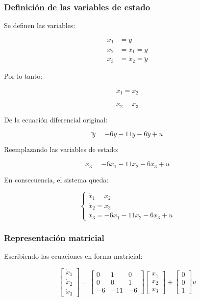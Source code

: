 \documentclass[12pt,a4paper]{article}
\begin{document}
\subsubsection*{Definición de las variables de estado}
Se definen las variables:

\begin{align}x_1&=y\\x_2&=\dot{x}_1=\dot{y}\\x_3&=\dot{x}_2=\ddot{y}\end{align}

Por lo tanto:

\begin{equation}\dot{x}_1=x_2\end{equation}

\begin{equation}\dot{x}_2=x_3\end{equation}

De la ecuación diferencial original:

\begin{equation}\dddot{y}=-6y-11\dot{y}-6\ddot{y}+u\end{equation}

Reemplazando las variables de estado:

\begin{equation}\dot{x}_3=-6x_1-11x_2-6x_3+u\end{equation}

En consecuencia, el sistema queda:

\begin{equation}\begin{cases}\dot{x}_1=x_2\\\dot{x}_2=x_3\\\dot{x}_3=-6x_1-11x_2-6x_3+u\end{cases}\end{equation}
\subsubsection*{Representación matricial}
Escribiendo las ecuaciones en forma matricial:

\begin{equation}\begin{bmatrix}\dot{x}_1\\\dot{x}_2\\\dot{x}_3\end{bmatrix}=\begin{bmatrix}0&1&0\\0&0&1\\-6&-11&-6\end{bmatrix} \begin{bmatrix}x_1\\x_2\\x_3\end{bmatrix}+\begin{bmatrix}0\\0\\1\end{bmatrix}u\end{equation}
\end{document}

